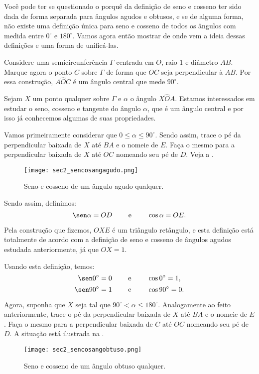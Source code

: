 \label{sencostgangqq}

Você pode ter se questionado o porquê da definição de seno e cosseno ter sido dada de forma separada para ângulos agudos e obtusos, e se de alguma forma, não existe uma definição única para seno e cosseno de todos os ângulos com medida entre $0^\circ$ e $180^\circ$. Vamos agora então mostrar de onde vem a ideia dessas definições e uma forma de unificá-las.

Considere uma semicircunferência $\Gamma$ centrada em $O$, raio $1$ e diâmetro $AB$. Marque agora o ponto $C$ sobre $\Gamma$ de forma que $OC$ seja perpendicular à $AB$. Por essa construção, $A\hat{O}C$ é um ângulo central que mede $90^\circ$.

Sejam $X$ um ponto qualquer sobre $\Gamma$ e $\alpha$ o ângulo $X\hat{O}A$. Estamos interessados em estudar o seno, cosseno e tangente do ângulo $\alpha$, que é um ângulo central e por isso já conhecemos algumas de suas propriedades.

Vamos primeiramente considerar que $0\leq\alpha\leq 90^\circ$. Sendo assim, trace o pé da perpendicular baixada de $X$ até $BA$ e o nomeie de $E$. Faça o mesmo para a perpendicular baixada de $X$ até $OC$ nomeando seu pé de $D$. Veja a .
\begin{figure}[H]
    \centering
    \texttt{[image: sec2\_sencosangagudo.png]}
    \caption{Seno e cosseno de um ângulo agudo qualquer.}
    \label{sec2_sencosangagudo}
\end{figure}

Sendo assim, definimos:
$$\sen\alpha= OD \qquad \text{ e } \qquad \cos\alpha=OE.$$

Pela construção que fizemos, $OXE$ é um triângulo retângulo, e esta definição está totalmente de acordo com a definição de seno e cosseno de ângulos agudos estudada anteriormente, já que $OX=1$.

Usando esta definição, temos:
$$\sen0^\circ = 0 \qquad \text{ e } \qquad \cos0^\circ =1,$$
$$\sen90^\circ = 1 \qquad \text{ e } \qquad \cos90^\circ =0.$$

Agora, suponha que $X$ seja tal que $90^\circ<\alpha\leq 180^\circ$. Analogamente ao feito anteriormente, trace o pé da perpendicular baixada de $X$ até $BA$ e o nomeie de $E$. Faça o mesmo para a perpendicular baixada de $C$ até $OC$ nomeando seu pé de $D$. A situação está ilustrada na .
\begin{figure}[H]
    \centering
    \texttt{[image: sec2\_sencosangobtuso.png]}
    \caption{Seno e cosseno de um ângulo obtuso qualquer.}
    \label{sec2_sencosangobtuso}
\end{figure}

